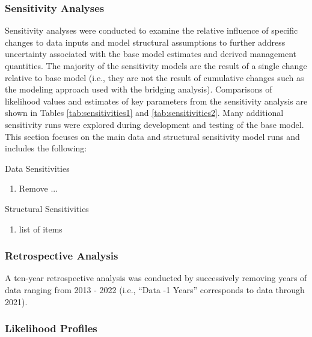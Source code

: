 \documentclass[11pt,
  english,
  letterpaper,
]{article}
\begin{document}
\hypertarget{sensitivity-analyses}{%
\subsubsection{Sensitivity Analyses}\label{sensitivity-analyses}}

Sensitivity analyses were conducted to examine the relative influence of specific changes to data inputs and model structural assumptions to further address uncertainty associated with the base model estimates and derived management quantities. The majority of the sensitivity models are the result of a single change relative to base model (i.e., they are not the result of cumulative changes such as the modeling approach used with the bridging analysis). Comparisons of likelihood values and estimates of key parameters from the sensitivity analysis are shown in Tables \ref{tab:sensitivities1} and \ref{tab:sensitivities2}. Many additional sensitivity runs were explored during development and testing of the base model. This section focuses on the main data and structural sensitivity model runs and includes the following:

Data Sensitivities

\begin{enumerate}
   
  \item Remove ...
  
\end{enumerate}

Structural Sensitivities

\begin{enumerate}
   
  \item  list of items

\end{enumerate}

\hypertarget{retrospective-analysis}{%
\subsubsection{Retrospective Analysis}\label{retrospective-analysis}}

A ten-year retrospective analysis was conducted by successively removing years of data ranging from 2013 - 2022 (i.e., ``Data -1 Years'' corresponds to data through 2021).

\hypertarget{likelihood-profiles}{%
\subsubsection{Likelihood Profiles}\label{likelihood-profiles}}
\end{document}
